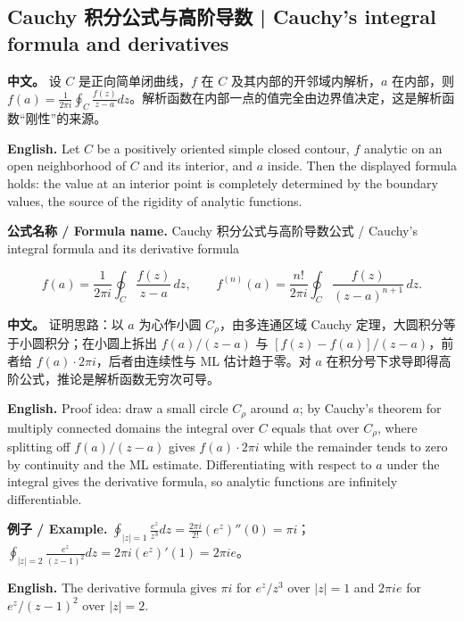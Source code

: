 \documentclass[UTF8,11pt,a4paper]{ctexart}
\newcommand{\EN}[1]{\par\noindent \textbf{English.} #1\par}
\newcommand{\FORMULA}[2]{\par\noindent\textbf{公式名称 / Formula name.} #1 / #2\par}
\newcommand{\EX}[2]{\par\noindent \textbf{例子 / Example.} #1\par\EN{#2}}
\newcommand{\APS}[2]{\par\noindent\textbf{中文。} #1\par\noindent\textbf{English.} #2\par\smallskip}
\begin{document}
\subsection{Cauchy 积分公式与高阶导数 | Cauchy's integral formula and derivatives}
\APS{设 $C$ 是正向简单闭曲线，$f$ 在 $C$ 及其内部的开邻域内解析，$a$ 在内部，则 $f(a)=\frac1{2\pi i}\oint_C\frac{f(z)}{z-a}dz$。解析函数在内部一点的值完全由边界值决定，这是解析函数“刚性”的来源。}{Let $C$ be a positively oriented simple closed contour, $f$ analytic on an open neighborhood of $C$ and its interior, and $a$ inside. Then the displayed formula holds: the value at an interior point is completely determined by the boundary values, the source of the rigidity of analytic functions.}
\FORMULA{Cauchy 积分公式与高阶导数公式}{Cauchy's integral formula and its derivative formula}
\[
f(a)=\frac1{2\pi i}\oint_C\frac{f(z)}{z-a}\,dz,\qquad
f^{(n)}(a)=\frac{n!}{2\pi i}\oint_C\frac{f(z)}{(z-a)^{n+1}}\,dz.
\]
\APS{证明思路：以 $a$ 为心作小圆 $C_\rho$，由多连通区域 Cauchy 定理，大圆积分等于小圆积分；在小圆上拆出 $f(a)/(z-a)$ 与 $[f(z)-f(a)]/(z-a)$，前者给 $f(a)\cdot2\pi i$，后者由连续性与 ML 估计趋于零。对 $a$ 在积分号下求导即得高阶公式，推论是解析函数无穷次可导。}{Proof idea: draw a small circle $C_\rho$ around $a$; by Cauchy's theorem for multiply connected domains the integral over $C$ equals that over $C_\rho$, where splitting off $f(a)/(z-a)$ gives $f(a)\cdot2\pi i$ while the remainder tends to zero by continuity and the ML estimate. Differentiating with respect to $a$ under the integral gives the derivative formula, so analytic functions are infinitely differentiable.}
\EX{$\oint_{|z|=1}\frac{e^z}{z^3}dz=\frac{2\pi i}{2!}(e^z)''(0)=\pi i$；$\oint_{|z|=2}\frac{e^z}{(z-1)^2}dz=2\pi i(e^z)'(1)=2\pi ie$。}{The derivative formula gives $\pi i$ for $e^z/z^3$ over $|z|=1$ and $2\pi ie$ for $e^z/(z-1)^2$ over $|z|=2$.}
\end{document}
